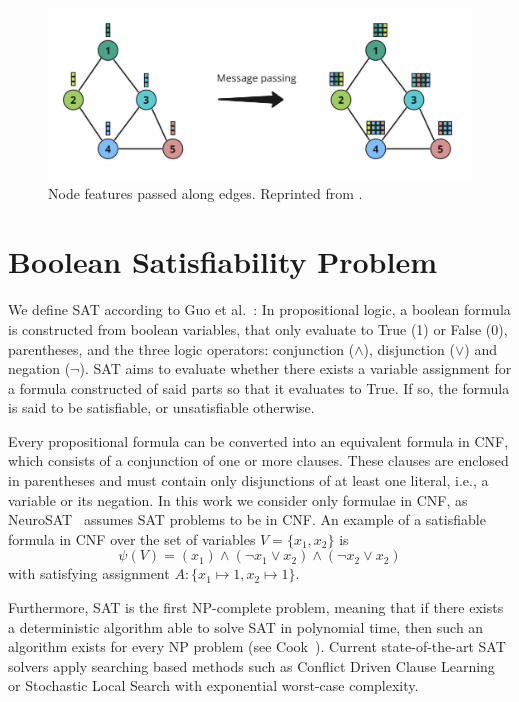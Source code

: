 \begin{figure}
    \includegraphics[width=\textwidth]{img/message_passing.png}
    \caption[Message passing]{Node features passed along edges. Reprinted from \cite{ali2023gnns}.}
    \label{fig:message_passing}
\end{figure}


\section{Boolean Satisfiability Problem}
\label{sec:SAT}
We define SAT according to Guo et al.~\cite{guo2023machine}: In propositional logic, a boolean formula is constructed from boolean variables, that only evaluate to True (1) or False (0), parentheses, and the three logic operators: conjunction ($\wedge$), disjunction ($\vee$) and negation ($\neg$). SAT aims to evaluate whether there exists a variable assignment for a formula constructed of said parts so that it evaluates to True. If so, the formula is said to be satisfiable, or unsatisfiable otherwise. 

Every propositional formula can be converted into an equivalent formula in \ac{CNF}, which consists of a conjunction of one or more clauses. These clauses are enclosed in parentheses and must contain only disjunctions of at least one literal, i.e., a variable or its negation. In this work we consider only formulae in CNF, as NeuroSAT~\cite{selsam2018learning} assumes SAT problems to be in CNF. An example of a satisfiable formula in CNF over the set of variables $V=\{x_1,x_2\}$ is 
$$\psi(V) = (x_1) \land (\neg x_1 \lor x_2) \land (\neg x_2 \lor x_2)$$
with satisfying assignment $A:\{x_1 \mapsto 1, x_2 \mapsto 1\}$. 

Furthermore, SAT is the first NP-complete problem, meaning that if there exists a deterministic algorithm able to solve SAT in polynomial time, then such an algorithm exists for every NP problem (see Cook~\cite{cook2023complexity}). Current state-of-the-art SAT solvers apply searching based methods such as Conflict Driven Clause Learning \cite{marques1999grasp} or Stochastic Local Search \cite{selman1993local} with exponential worst-case complexity.


